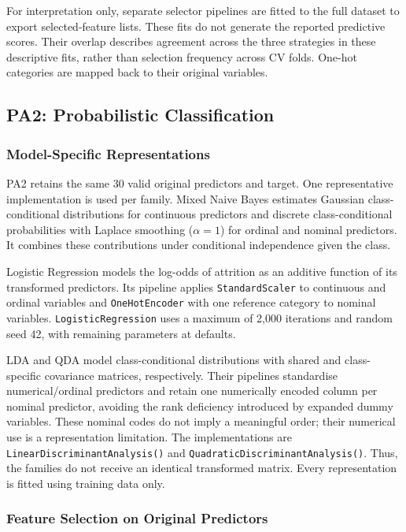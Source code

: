 For interpretation only, separate selector pipelines are fitted to the full dataset to export selected-feature lists. These fits do not generate the reported predictive scores. Their overlap describes agreement across the three strategies in these descriptive fits, rather than selection frequency across CV folds. One-hot categories are mapped back to their original variables.

\subsection{PA2: Probabilistic Classification}
\subsubsection{Model-Specific Representations}
PA2 retains the same 30 valid original predictors and target. One representative implementation is used per family. Mixed Naive Bayes estimates Gaussian class-conditional distributions for continuous predictors and discrete class-conditional probabilities with Laplace smoothing ($\alpha=1$) for ordinal and nominal predictors. It combines these contributions under conditional independence given the class.

Logistic Regression models the log-odds of attrition as an additive function of its transformed predictors. Its pipeline applies \texttt{StandardScaler} to continuous and ordinal variables and \texttt{OneHotEncoder} with one reference category to nominal variables. \texttt{LogisticRegression} uses a maximum of 2,000 iterations and random seed 42, with remaining parameters at defaults.

LDA and QDA model class-conditional distributions with shared and class-specific covariance matrices, respectively. Their pipelines standardise numerical/ordinal predictors and retain one numerically encoded column per nominal predictor, avoiding the rank deficiency introduced by expanded dummy variables. These nominal codes do not imply a meaningful order; their numerical use is a representation limitation. The implementations are \texttt{LinearDiscriminantAnalysis()} and \texttt{QuadraticDiscriminantAnalysis()}. Thus, the families do not receive an identical transformed matrix. Every representation is fitted using training data only.

\subsubsection{Feature Selection on Original Predictors}
